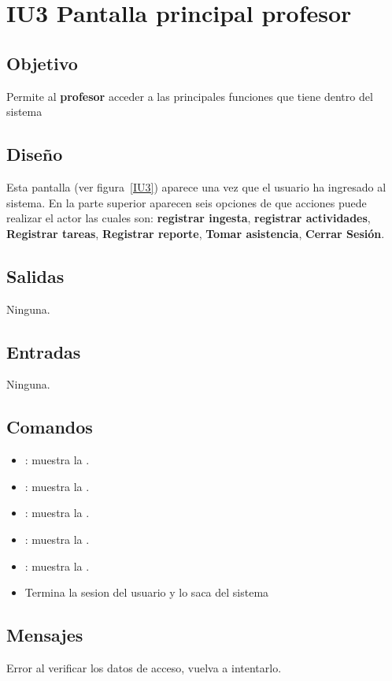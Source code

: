 \newpage
\section{IU3 Pantalla principal profesor}

\subsection{Objetivo}
	Permite al {\bf profesor} acceder a las principales funciones que tiene dentro del sistema

\subsection{Diseño}
	Esta pantalla  (ver figura~\ref{IU3}) aparece una vez que el usuario ha ingresado al sistema. 
 En la parte superior aparecen seis opciones de que acciones puede realizar el actor las cuales son: {\bf registrar ingesta}, {\bf registrar actividades}, {\bf Registrar tareas}, {\bf Registrar reporte}, {\bf Tomar asistencia}, {\bf Cerrar Sesión}. 

 

\subsection{Salidas}

	Ninguna.

\subsection{Entradas}
        Ninguna.

\subsection{Comandos}
\begin{itemize}
	\item {}: muestra la .
        \item {}: muestra la .
        \item {}: muestra la .
        \item {}: muestra la .
        \item {}: muestra la .
        \item {}Termina la sesion del usuario y lo saca del sistema
\end{itemize}

\subsection{Mensajes}

\begin{Citemize}
	\item Error al verificar los datos de acceso, vuelva a intentarlo.
\end{Citemize}

